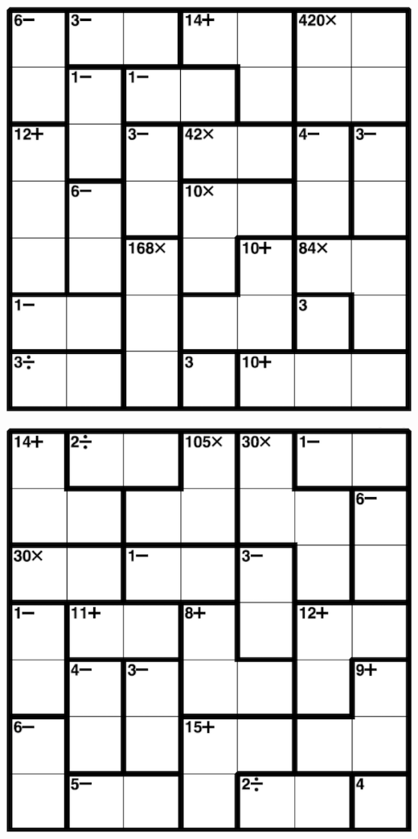 
\includegraphics[scale=1]{Gambar/Lampiran/7x7_7.png}

\includegraphics[scale=1]{Gambar/Lampiran/7x7_8.png}
